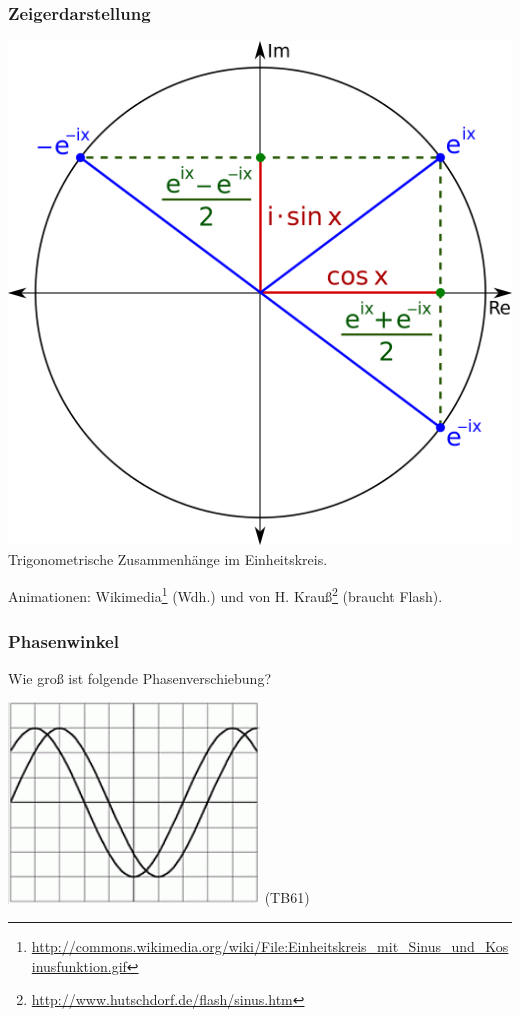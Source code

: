 \begin{frame}
  \frametitle{Zeigerdarstellung}

  \begin{center}
    \includegraphics[width=\textwidth,height=0.5\textheight,keepaspectratio]{a11/Sine_Cosine_Exponential_qtl1.png}
    \tiny \hyperlink{refs}{\cite{wc}}\\
    \normalsize Trigonometrische Zusammenhänge im Einheitskreis.
  \end{center}

  Animationen:
  Wikimedia\footnote{\tiny\url{http://commons.wikimedia.org/wiki/File:Einheitskreis_mit_Sinus_und_Kosinusfunktion.gif}}
  (Wdh.) und von H.
  Krauß\footnote{\tiny\url{http://www.hutschdorf.de/flash/sinus.htm}} (braucht
  Flash).

\end{frame}

\begin{frame}
  \frametitle{Phasenwinkel}

  \begin{block}{
    Wie groß ist folgende Phasenverschiebung?
    \begin{center}
      \includegraphics[width=0.5\textwidth]{a11/TB612.png}
      \tiny (TB61)
    \end{center}
    }
  \end{block}


\end{frame}

